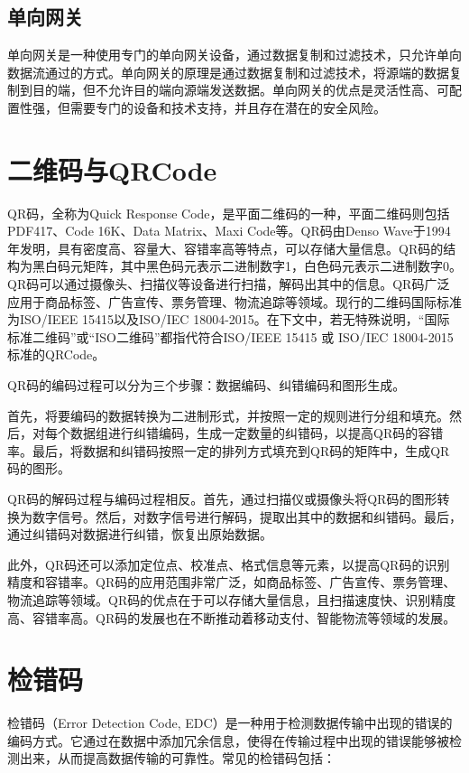 \subsection{单向网关}

单向网关是一种使用专门的单向网关设备，通过数据复制和过滤技术，只允许单向数据流通过的方式\cite{paulus2006lock}。单向网关的原理是通过数据复制和过滤技术，将源端的数据复制到目的端，但不允许目的端向源端发送数据。单向网关的优点是灵活性高、可配置性强，但需要专门的设备和技术支持，并且存在潜在的安全风险。

\section{二维码与QRCode}

QR码，全称为Quick Response Code，是平面二维码的一种，平面二维码则包括PDF417、Code 16K、Data Matrix、Maxi Code等。QR码由Denso Wave于1994年发明，具有密度高、容量大、容错率高等特点，可以存储大量信息。QR码的结构为黑白码元矩阵，其中黑色码元表示二进制数字1，白色码元表示二进制数字0。QR码可以通过摄像头、扫描仪等设备进行扫描，解码出其中的信息。QR码广泛应用于商品标签、广告宣传、票务管理、物流追踪等领域。现行的二维码国际标准为ISO/IEEE 15415以及ISO/IEC 18004-2015。在下文中，若无特殊说明，“国际标准二维码”或“ISO二维码”都指代符合ISO/IEEE 15415 或 ISO/IEC 18004-2015标准的QRCode。


QR码的编码过程可以分为三个步骤：数据编码、纠错编码和图形生成。

首先，将要编码的数据转换为二进制形式，并按照一定的规则进行分组和填充。然后，对每个数据组进行纠错编码，生成一定数量的纠错码，以提高QR码的容错率。最后，将数据和纠错码按照一定的排列方式填充到QR码的矩阵中，生成QR码的图形。

QR码的解码过程与编码过程相反。首先，通过扫描仪或摄像头将QR码的图形转换为数字信号。然后，对数字信号进行解码，提取出其中的数据和纠错码。最后，通过纠错码对数据进行纠错，恢复出原始数据。

此外，QR码还可以添加定位点、校准点、格式信息等元素，以提高QR码的识别精度和容错率。QR码的应用范围非常广泛，如商品标签、广告宣传、票务管理、物流追踪等领域。QR码的优点在于可以存储大量信息，且扫描速度快、识别精度高、容错率高。QR码的发展也在不断推动着移动支付、智能物流等领域的发展。

\section{检错码}

检错码（Error Detection Code, EDC）是一种用于检测数据传输中出现的错误的编码方式。它通过在数据中添加冗余信息，使得在传输过程中出现的错误能够被检测出来，从而提高数据传输的可靠性。常见的检错码包括：

